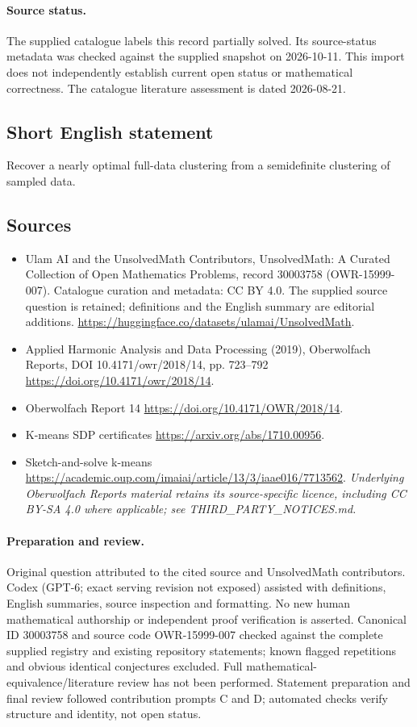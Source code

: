 \documentclass[11pt]{article}
\begin{document}
\paragraph{Source status.}
The supplied catalogue labels this record partially solved. Its source-status metadata was checked against the supplied snapshot on 2026-10-11. This import does not independently establish current open status or mathematical correctness. The catalogue literature assessment is dated 2026-08-21.
\subsection{Short English statement}
Recover a nearly optimal full-data clustering from a semidefinite clustering of sampled data.
\subsection{Sources}
\begin{itemize}
\item[S1] Ulam AI and the UnsolvedMath Contributors, UnsolvedMath: A Curated Collection of Open Mathematics Problems, record 30003758 (OWR-15999-007). Catalogue curation and metadata: CC BY 4.0. The supplied source question is retained; definitions and the English summary are editorial additions.
\url{https://huggingface.co/datasets/ulamai/UnsolvedMath}.
\item[S2] Applied Harmonic Analysis and Data Processing (2019), Oberwolfach Reports, DOI 10.4171/owr/2018/14, pp. 723--792
\url{https://doi.org/10.4171/owr/2018/14}.
\item[S3] Oberwolfach Report 14
\url{https://doi.org/10.4171/OWR/2018/14}.
\item[S4] K-means SDP certificates
\url{https://arxiv.org/abs/1710.00956}.
\item[S5] Sketch-and-solve k-means
\url{https://academic.oup.com/imaiai/article/13/3/iaae016/7713562}.
\textit{Underlying Oberwolfach Reports material retains its source-specific licence, including CC BY-SA 4.0 where applicable; see THIRD\_PARTY\_NOTICES.md.}
\end{itemize}
\paragraph{Preparation and review.}
Original question attributed to the cited source and UnsolvedMath contributors. Codex (GPT-6; exact serving revision not exposed) assisted with definitions, English summaries, source inspection and formatting. No new human mathematical authorship or independent proof verification is asserted. Canonical ID 30003758 and source code OWR-15999-007 checked against the complete supplied registry and existing repository statements; known flagged repetitions and obvious identical conjectures excluded. Full mathematical-equivalence/literature review has not been performed. Statement preparation and final review followed contribution prompts C and D; automated checks verify structure and identity, not open status.
\label{end:30003758}
\end{document}
